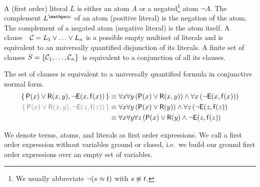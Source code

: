 
\begin{definition}\label{def:literals}
A (first order) {\myem literal} $L$ is either an atom $A$ or a negated\footnote{
We usually abbreviate $\lnot(s\approx t)$ with $s\not\approx t$.
} 
atom $\lnot A$.
%
The {\myem complement} $L^\mcc$ of an atom (positive literal) is the negation of the atom.
The complement of a negated atom (negative literal) is the atom itself. 
%
A {\myem clause}\ \ ${\mathcal C} = L_1\lor\ldots\lor L_n$  is a possible empty multiset of literals 
and is equivalent to an universally quantified disjunction of its literals.
%
A finite {\myem set of clauses} $S=\{ {\mathcal C}_1,\ldots,{\mathcal C}_n \}$ is equivalent to a conjunction of all its clauses.
%
\end{definition}

\begin{example}The set of clauses is equivalent to a universally quantified formula in conjunctive normal form.
	\begin{align*}
		\{\, \mP(x)\lor\mR(x,y), \lnot \mE(x,\mf(x)) \, \}
		&\equiv
		\forall x \forall y\, (\mP(x)\lor\mR(x,y))
		\land
		\forall x\, (\lnot \mE(x,\mf(x))) 
		\\
		{\colG
			\{\, \mP(x)\lor\mR(x,y), \lnot \mE(z,\mf(z)) \, \}}
		&\equiv
		\forall x \forall y\, (\mP(x)\lor\mR(y))
		\land
		\forall z\,(\lnot \mE(z,\mf(z)) 
		\\
		&\equiv
		\forall x \forall y\forall z\, 
		(\mP(x)\lor\mR(y)\land \lnot \mE(z,\mf(z))
	\end{align*}
\end{example}

\begin{definition}
	We denote
	terms, atoms, and literals as first order expressions.
	We call a first order expression without variables {\myem ground} or {\myem closed}, 
	i.e.~we build our ground first order expressions over an empty set of variables.
\end{definition}

